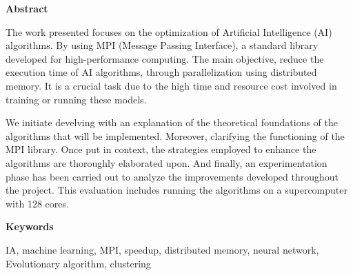 
\newpage

\thispagestyle{empty}

\begin{center}

{\bf \Huge Abstract}

  \end{center}
\vspace{1cm}

The work presented focuses on the optimization of Artificial Intelligence (AI) algorithms. By using MPI (Message Passing Interface), a standard library developed for high-performance computing.
The main objective, reduce the execution time of AI algorithms, through parallelization using distributed memory. It is a crucial task due to the high time and resource cost involved in training or running these models.

We initiate develving with an explanation of the theoretical foundations of the algorithms that will be implemented. Moreover, clarifying the functioning of the MPI library.
Once put in context, the strategies employed to enhance the algorithms are thoroughly elaborated upon.
And finally, an experimentation phase has been carried out to analyze the improvements developed throughout the project. This evaluation includes running the algorithms on a supercomputer with 128 cores.

\vspace{1cm}


\begin{center}

{\bf \Large Keywords}

   \end{center}

   \vspace{0.5cm}
   
IA, machine learning, MPI, speedup, distributed memory, neural network, Evolutionary algorithm, clustering
   


